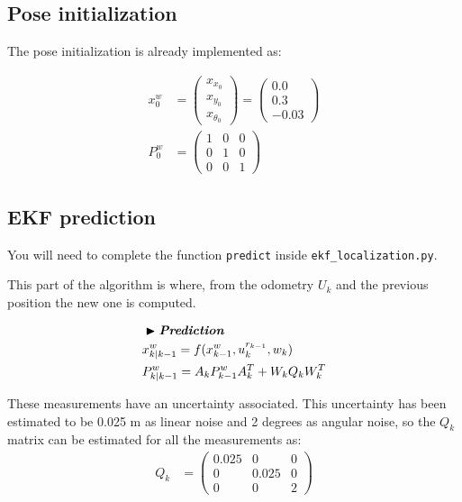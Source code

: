 \documentclass[a4paper,10pt]{article}
\begin{document}
\subsection{Pose initialization}
The pose initialization is already implemented as:

\begin{align}
    \label{x_0}
    x_0^w &= \begin{pmatrix}
        x_{x_0}\\x_{y_0}\\x_{\theta_0}
    \end{pmatrix} = \begin{pmatrix}
        0.0\\0.3\\-0.03
    \end{pmatrix}\\
    \label{P_0}
    P_0^w &= \begin{pmatrix}
    1 & 0 & 0 \\0 & 1 & 0 \\0 & 0 & 1 
    \end{pmatrix}
\end{align}

\subsection{EKF prediction}

You will need to complete the function \texttt{predict} inside \texttt{ekf\_localization.py}.

This part of the algorithm is where, from the odometry $U_k$ and the previous position the new one is computed. 

\begin{align*}
    & \blacktriangleright \textit{\textbf{Prediction}}\\
    & x_{k|k-1}^w = f(x_{k-1}^w ,u_k^{r_{k-1}}, w_k) \\
    & P_{k|k-1}^w = A_k P_{k-1}^w A_k^T + W_k Q_k W_k^T\\
\end{align*}

These measurements have an uncertainty associated. This uncertainty has been estimated to be 0.025 m as linear noise and 2 degrees as angular noise, so the $Q_k$ matrix can be estimated for all the measurements as:
\begin{align}
    \label{q_k}
    Q_k &= \begin{pmatrix}
	    0.025 & 0 & 0\\0 & 0.025 & 0\\ 0 & 0 & 2
	\end{pmatrix}
\end{align}
\end{document}
